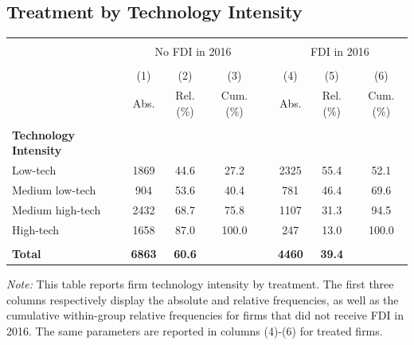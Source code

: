 \documentclass[a4paper,11pt]{scrartcl}
\begin{document}
\setcounter{figure}{0}
\subsection{Treatment by Technology Intensity}
\label{app:tech}

\begin{table}[htbp]
	\centering

\begin{threeparttable}

\begin{tabular}{lccccccc} 
\hline
\hline \\[-0.8em]
 & \multicolumn{3}{c}{No FDI in 2016} & & \multicolumn{3}{c}{FDI in 2016} \\ \cline{2-4} \cline{6-8} \\[-0.8em]
 & (1) & (2) & (3) && (4) & (5) & (6) \\
 & Abs. & Rel.(\%) &Cum.(\%)  && Abs. & Rel.(\%) & Cum.(\%)\\
\hline \\[-0.8em]
\textbf{Technology Intensity} & & & & & & & \\
Low-tech 		&1869	&44.6	&27.2	&&2325	&55.4	&52.1 \\
Medium low-tech &904	&53.6	&40.4	&&781	&46.4	&69.6 \\
Medium high-tech &2432	&68.7	&75.8	&&1107	&31.3	&94.5 \\
High-tech 		&1658	&87.0	&100.0	&&247	&13.0	&100.0 \\ \\[-0.8em]
\textbf{Total}&\textbf{6863}&\textbf{60.6}&&&\textbf{4460}&\textbf{39.4}& \\
\hline
\hline
\end{tabular}
\begin{tablenotes}[flushleft]
\footnotesize
\item\textit{Note:} This table reports firm technology intensity by treatment. The first three columns respectively display the absolute and relative frequencies, as well as the cumulative within-group relative frequencies for firms that did not receive FDI in 2016. The same parameters are reported in columns (4)-(6) for treated firms. 


\end{tablenotes}
\end{threeparttable}
\end{table}
\newpage
\end{document}
